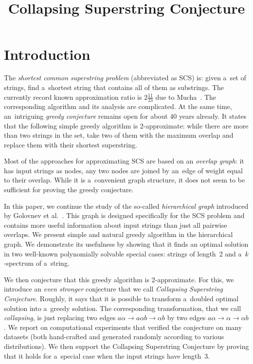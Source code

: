 \documentclass[11pt,letterpaper]{article}
\begin{document}
\sloppy
\author{}
\title{Collapsing Superstring Conjecture}
\maketitle

\section{Introduction}
The {\em shortest common superstring problem} (abbreviated as SCS) is:
given a~set of strings, find a~shortest string that contains all of them as
substrings. The currently record known approximation ratio is 
$2\frac{11}{23}$ due to Mucha~\cite{}.
The corresponding algorithm and its analysis are complicated.
At the same time, an~intriguing {\em greedy conjecture} remains open
for about 40 years already. It states that the following simple 
greedy algorithm is 2-approximate: while there are more than two strings 
in the set, take two of them with the maximum overlap and replace them
with their shortest superstring.

Most of the approaches for approximating SCS are based on an
{\em overlap graph}: it has input strings as nodes, any two nodes 
are joined by an~edge of weight equal to their overlap.  
While it is a~convenient graph structure, it does not seem to be sufficient
for proving the greedy conjecture.

In this paper, we continue the study of the so-called {\em hierarchical graph}
introduced by Golovnev et al.~\cite{}. This graph is designed specifically 
for the SCS problem and contains more useful information about input strings
than just all pairwise overlaps. We present simple and natural greedy algorithm
in the hierarchical graph. 
We demonstrate its usefulness by showing that it finds an optimal solution 
in two well-known polynomially solvable special cases: strings of length~2 and
a~$k$-spectrum of a~string.

We then conjecture that this greedy algorithm is 2-approximate. For this, we introduce an {\em even stronger} conjecture that we call 
{\em Collapsing Superstring Conjecture}. 
Roughly, it says that it is possible to transform a~doubled optimal 
solution into a~greedy solution. 
The corresponding transformation, that we call {\em collapsing}, 
is just replacing two edges $a\alpha \to a\alpha b \to \alpha b$ 
by two edges $a\alpha \to \alpha \to \alpha b$. 
We report on computational experiments that verified the 
conjecture on many datasets (both hand-crafted and generated randomly
according to various distributions). 
We then support the Collapsing Superstring Conjecture by 
proving that it holds for a~special case when the input strings have length~3.
\end{document}
